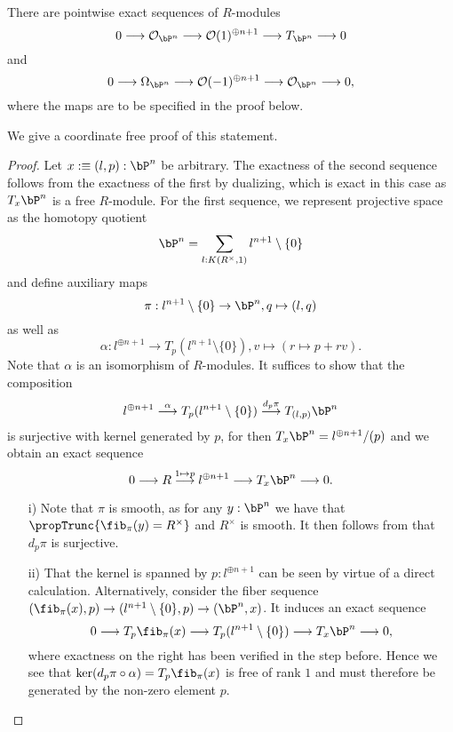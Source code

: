 \begin{lemma}
  There are pointwise exact sequences of $R$-modules
  \[
    0 \longrightarrow
    \mathcal O_{\bP^n} \longrightarrow
    \mathcal O(1)^{\oplus n+1} \longrightarrow
    T_{\bP^n} \longrightarrow
    0
  \]
  and
  \[
    0 \longrightarrow
    \Omega_{\bP^n} \longrightarrow
    \mathcal O(-1)^{\oplus n+1} \longrightarrow
    \mathcal O_{\bP^n} \longrightarrow
    0,
  \]
  where the maps are to be specified in the proof below.
\end{lemma}

  We give a coordinate free proof of this statement.

\begin{proof}
  Let $x :\equiv (l,p) : \bP^n$ be arbitrary.
  The exactness of the second sequence follows from the exactness of the first by dualizing,
  which is exact in this case as $T_x\bP^n$ is a free $R$-module.
  For the first sequence, we represent projective space as the homotopy quotient
  \[
    \bP^n = \sum_{l : K(R^\times,1)} l^{n+1}\setminus\{0\}
  \]
  and define auxiliary maps
  \[
    \pi : l^{n+1}\setminus\{0\} \to \bP^n, q \mapsto (l,q)
  \]
  as well as
  \[
    \alpha : l^{\oplus n+1} \to T_p(l^{n+1}\setminus\{0\}), v \mapsto (r \mapsto p + rv).
  \]
  Note that $\alpha$ is an isomorphism of $R$-modules.
  It suffices to show that the composition
  \[
    l^{\oplus n+1} \overset{\alpha}{\longrightarrow}
    T_p(l^{n+1}\setminus\{0\}) \overset{d_p\pi}{\longrightarrow}
  T_{(l,p)}\bP^n
  \]
  is surjective with kernel generated by $p$, for then $T_x\bP^n = l^{\oplus n+1}/(p)$ and we obtain an exact sequence
  \[
    0 \longrightarrow
    R \overset{1 \mapsto p}{\longrightarrow}
    l^{\oplus n+1} \longrightarrow
    T_x\bP^n \longrightarrow 0.
  \]
  \begin{enumerate}
    \item[i)]
    Note that $\pi$ is smooth, as for any $y : \bP^n$ we have that $\propTrunc{\fib_\pi(y) = R^\times}$ and $R^\times$ is smooth.
    It then follows from \cite[Corollary 4.1.1]{diffgeo-article} that $d_p\pi$ is surjective.


    \item[ii)]
    That the kernel is spanned by $p : l^{\oplus n+1}$ can be seen by virtue of a direct calculation.
    Alternatively, consider the fiber sequence $(\fib_\pi(x),p) \to (l^{n+1}\setminus\{0\},p) \to (\bP^n,x)$.
    It induces an exact sequence
    \[
      0 \longrightarrow
      T_p\fib_\pi(x) \longrightarrow
      T_p(l^{n+1}\setminus\{0\}) \longrightarrow
      T_x\bP^n \longrightarrow
      0,
    \]
    where exactness on the right has been verified in the step before.
    Hence we see that $\ker(d_p\pi \circ \alpha) = T_p\fib_\pi(x)$ is free of rank $1$ and must therefore be generated by the non-zero element $p$.
\end{enumerate}
\end{proof}

